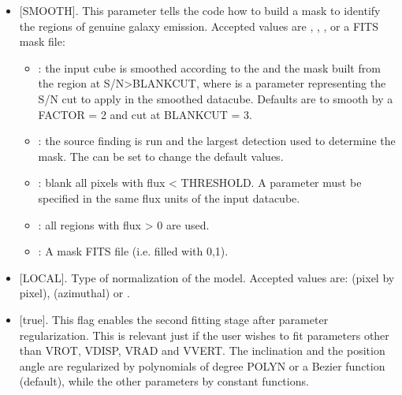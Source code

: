 \documentclass[letterpaper,10pt,english]{sphinxmanual}
\begin{document}
\begin{itemize}
\item {} 
 {[}SMOOTH{]}. This parameter tells the code how to build a mask to identify the regions of genuine galaxy emission. Accepted values are , , ,  or a FITS mask file:
\begin{itemize}
\item {} 
: the input cube is smoothed according to the {\hyperref[\detokenize{tasks:smoothtask}]{}} and the mask built from the region at S/N\textgreater{}BLANKCUT, where  is a parameter representing the S/N cut to apply in the smoothed datacube. Defaults are to smooth by a FACTOR = 2 and cut at BLANKCUT = 3.

\item {} 
: the source finding is run and the largest detection used to determine the mask. The {\hyperref[\detokenize{tasks:searchtask}]{}} can be set to change the default values.

\item {} 
: blank all pixels with flux \textless{} THRESHOLD. A  parameter must be specified in the same flux units of the input datacube.

\item {} 
: all regions with flux \textgreater{} 0 are used.

\item {} 
: A mask FITS file (i.e. filled with 0,1).

\end{itemize}

\item {} 
 {[}LOCAL{]}. Type of normalization of the model. Accepted values are:  (pixel by pixel),  (azimuthal) or .

\item {} 
 {[}true{]}. This flag enables the second fitting stage after parameter regularization. This is relevant just if the user wishes to fit parameters other than VROT, VDISP, VRAD and VVERT. The inclination and the position angle are regularized by polynomials of degree POLYN or a Bezier function (default), while the other parameters by constant functions.


\end{itemize}
\end{document}
